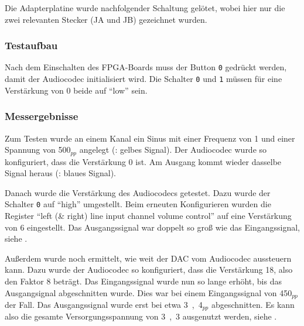 

Die Adapterplatine wurde nachfolgender Schaltung gelötet, wobei hier nur die zwei relevanten Stecker (JA und JB) gezeichnet wurden.


\subsubsection{Testaufbau}

Nach dem Einschalten des FPGA-Boards muss der Button \texttt{0} gedrückt werden, damit der Audiocodec initialisiert wird. Die Schalter \texttt{0} und \texttt{1} müssen für eine Verstärkung von \unit{0}{\deci\bel} beide auf \enquote{low} sein.

\subsubsection{Messergebnisse}
Zum Testen wurde an einem Kanal ein Sinus mit einer Frequenz von \unit{1}{\kilo\hertz} und einer Spannung von \unit{500}{\milli\volt}$_{pp}$ angelegt (: gelbes Signal). Der Audiocodec wurde so konfiguriert, dass die Verstärkung \unit{0}{\deci\bel} ist. Am Ausgang kommt wieder dasselbe Signal heraus (: blaues Signal).


Danach wurde die Verstärkung des Audiocodecs getestet. Dazu wurde der Schalter \texttt{0} auf \enquote{high} umgestellt. Beim erneuten Konfigurieren wurden die Register \enquote{left (\& right) line input channel volume control} auf eine Verstärkung von \unit{6}{\deci\bel} eingestellt. Das Ausgangssignal war doppelt so groß wie das Eingangssignal, siehe .


Außerdem wurde noch ermittelt, wie weit der \gls{DAC} vom Audiocodec aussteuern kann. Dazu wurde der Audiocodec so konfiguriert, dass die Verstärkung \unit{18}{\deci\bel}, also den Faktor 8 beträgt. Das Eingangssignal wurde nun so lange erhöht, bis das Ausgangsignal abgeschnitten wurde. Dies war bei einem Eingangssignal von \unit{450}{\milli\volt}$_{pp}$ der Fall. Das Ausgangssignal wurde erst bei etwa \unit{3,4}{\volt}$_{pp}$ abgeschnitten. Es kann also die gesamte Versorgungsspannung von \unit{3,3}{\volt} ausgenutzt werden, siehe .


